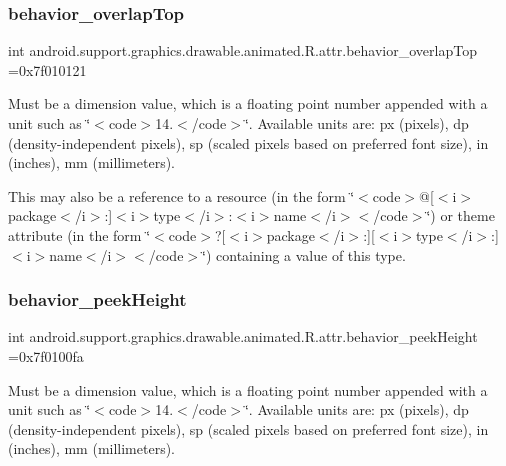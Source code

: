 \subsubsection{\texorpdfstring{behavior\+\_\+overlap\+Top}{behavior\_overlapTop}}
{\footnotesize\ttfamily int android.\+support.\+graphics.\+drawable.\+animated.\+R.\+attr.\+behavior\+\_\+overlap\+Top =0x7f010121\hspace{0.3cm}{\ttfamily [static]}}

Must be a dimension value, which is a floating point number appended with a unit such as \char`\"{}$<$code$>$14.\+5sp$<$/code$>$\char`\"{}. Available units are\+: px (pixels), dp (density-\/independent pixels), sp (scaled pixels based on preferred font size), in (inches), mm (millimeters). 

This may also be a reference to a resource (in the form \char`\"{}$<$code$>$@\mbox{[}$<$i$>$package$<$/i$>$\+:\mbox{]}$<$i$>$type$<$/i$>$\+:$<$i$>$name$<$/i$>$$<$/code$>$\char`\"{}) or theme attribute (in the form \char`\"{}$<$code$>$?\mbox{[}$<$i$>$package$<$/i$>$\+:\mbox{]}\mbox{[}$<$i$>$type$<$/i$>$\+:\mbox{]}$<$i$>$name$<$/i$>$$<$/code$>$\char`\"{}) containing a value of this type. \mbox{\label{classandroid_1_1support_1_1graphics_1_1drawable_1_1animated_1_1R_1_1attr_aea3d030f7d8a3d4a972d27bab3520694}} 
\subsubsection{\texorpdfstring{behavior\+\_\+peek\+Height}{behavior\_peekHeight}}
{\footnotesize\ttfamily int android.\+support.\+graphics.\+drawable.\+animated.\+R.\+attr.\+behavior\+\_\+peek\+Height =0x7f0100fa\hspace{0.3cm}{\ttfamily [static]}}

Must be a dimension value, which is a floating point number appended with a unit such as \char`\"{}$<$code$>$14.\+5sp$<$/code$>$\char`\"{}. Available units are\+: px (pixels), dp (density-\/independent pixels), sp (scaled pixels based on preferred font size), in (inches), mm (millimeters). 

